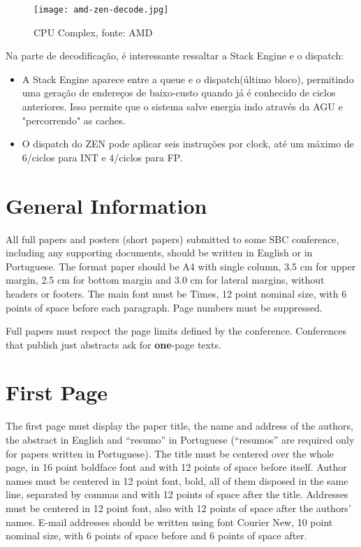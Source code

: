 \documentclass[12pt]{article}
\begin{document}
\begin{figure}[H]
\centering
\texttt{[image: amd-zen-decode.jpg]}
\caption{CPU Complex, fonte: AMD}
\label{fig:AMD CORE}
\end{figure}

Na parte de decodificação, é interessante ressaltar a Stack Engine e o dispatch:
\begin{itemize}
	\item A Stack Engine aparece entre a queue e o dispatch(último bloco), permitindo uma geração de endereços de baixo-custo quando já é conhecido de ciclos anteriores. Isso permite que o sistema salve energia indo através da AGU e "percorrendo" as caches.
	\item O dispatch do ZEN pode aplicar seis instruções por clock, até um máximo de 6/ciclos para INT e 4/ciclos para FP.
\end{itemize}

\newpage

\section{General Information}

All full papers and posters (short papers) submitted to some SBC conference,
including any supporting documents, should be written in English or in
Portuguese. The format paper should be A4 with single column, 3.5 cm for upper
margin, 2.5 cm for bottom margin and 3.0 cm for lateral margins, without
headers or footers. The main font must be Times, 12 point nominal size, with 6
points of space before each paragraph. Page numbers must be suppressed.

Full papers must respect the page limits defined by the conference.
Conferences that publish just abstracts ask for \textbf{one}-page texts.

\newpage

\section{First Page} \label{sec:firstpage}

The first page must display the paper title, the name and address of the
authors, the abstract in English and ``resumo'' in Portuguese (``resumos'' are
required only for papers written in Portuguese). The title must be centered
over the whole page, in 16 point boldface font and with 12 points of space
before itself. Author names must be centered in 12 point font, bold, all of
them disposed in the same line, separated by commas and with 12 points of
space after the title. Addresses must be centered in 12 point font, also with
12 points of space after the authors' names. E-mail addresses should be
written using font Courier New, 10 point nominal size, with 6 points of space
before and 6 points of space after.
\end{document}
